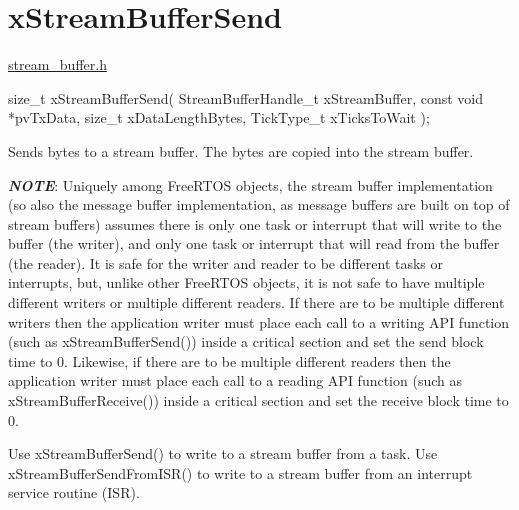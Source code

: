\hypertarget{group__x_stream_buffer_send}{}\section{x\+Stream\+Buffer\+Send}
\label{group__x_stream_buffer_send}
\mbox{\hyperlink{stream__buffer_8h_source}{stream\+\_\+buffer.\+h}}


\begin{DoxyPre}
size\_t xStreamBufferSend( StreamBufferHandle\_t xStreamBuffer,
                          const void *pvTxData,
                          size\_t xDataLengthBytes,
                          TickType\_t xTicksToWait );
\end{DoxyPre}


Sends bytes to a stream buffer. The bytes are copied into the stream buffer.

{\itshape {\bfseries{N\+O\+TE}}}\+: Uniquely among Free\+R\+T\+OS objects, the stream buffer implementation (so also the message buffer implementation, as message buffers are built on top of stream buffers) assumes there is only one task or interrupt that will write to the buffer (the writer), and only one task or interrupt that will read from the buffer (the reader). It is safe for the writer and reader to be different tasks or interrupts, but, unlike other Free\+R\+T\+OS objects, it is not safe to have multiple different writers or multiple different readers. If there are to be multiple different writers then the application writer must place each call to a writing A\+PI function (such as x\+Stream\+Buffer\+Send()) inside a critical section and set the send block time to 0. Likewise, if there are to be multiple different readers then the application writer must place each call to a reading A\+PI function (such as x\+Stream\+Buffer\+Receive()) inside a critical section and set the receive block time to 0.

Use x\+Stream\+Buffer\+Send() to write to a stream buffer from a task. Use x\+Stream\+Buffer\+Send\+From\+I\+S\+R() to write to a stream buffer from an interrupt service routine (I\+SR).


